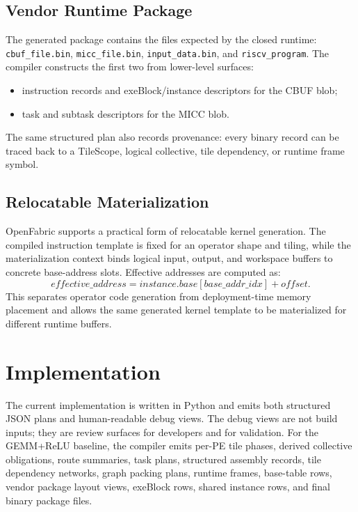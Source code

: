 \documentclass[conference]{IEEEtran}
\newcommand{\systemname}{OpenFabric}
\begin{document}
\subsection{Vendor Runtime Package}

The generated package contains the files expected by the closed runtime:
\texttt{cbuf\_file.bin}, \texttt{micc\_file.bin}, \texttt{input\_data.bin}, and
\texttt{riscv\_program}. The compiler constructs the first two from lower-level
surfaces:
\begin{itemize}
\item instruction records and exeBlock/instance descriptors for the CBUF blob;
\item task and subtask descriptors for the MICC blob.
\end{itemize}
The same structured plan also records provenance: every binary record can be
traced back to a TileScope, logical collective, tile dependency, or runtime frame
symbol.

\subsection{Relocatable Materialization}

\systemname{} supports a practical form of relocatable kernel generation. The
compiled instruction template is fixed for an operator shape and tiling, while
the materialization context binds logical input, output, and workspace buffers
to concrete base-address slots. Effective addresses are computed as:
\begin{equation}
\textit{effective\_address} =
\textit{instance.base}[\textit{base\_addr\_idx}] + \textit{offset}.
\end{equation}
This separates operator code generation from deployment-time memory placement
and allows the same generated kernel template to be materialized for different
runtime buffers.


\section{Implementation}

The current implementation is written in Python and emits both structured JSON
plans and human-readable debug views. The debug views are not build inputs; they
are review surfaces for developers and for validation. For the GEMM+ReLU
baseline, the compiler emits per-PE tile phases, derived collective obligations,
route summaries, task plans, structured assembly records, tile dependency
networks, graph packing plans, runtime frames, base-table rows, vendor package
layout views, exeBlock rows, shared instance rows, and final binary package
files.
\end{document}
